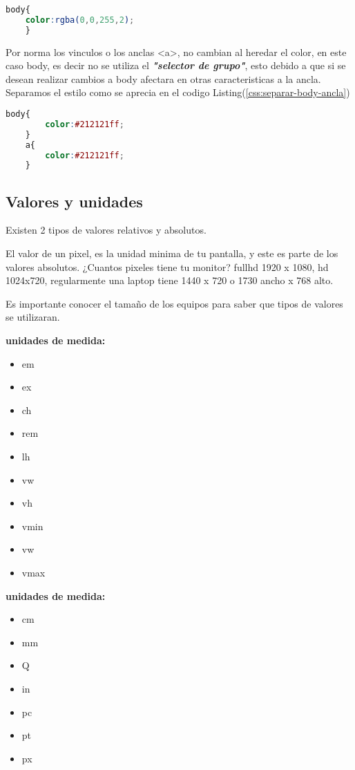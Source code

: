 \begin{lstlisting}[caption={Colores en css con hexadecimal},label={css:colores-rgba},language=css]
    body{
    color:rgba(0,0,255,2);
    }
\end{lstlisting}

Por norma los vinculos o los anclas <a>, no cambian al heredar el color, en este
caso body, es decir no se utiliza el \textbf{\textit{"selector de grupo"}}, esto debido
a que si se desean realizar cambios a body afectara en otras caracteristicas a la ancla.
Separamos el estilo como se aprecia en el codigo Listing(\ref{css:separar-body-ancla})

\begin{lstlisting}[caption={Colores en css con hexadecimal},label={css:colores-rgba},language=css]
    body{
        color:#212121ff;
    }
    a{
        color:#212121ff;
    }
\end{lstlisting}


\subsection{Valores y unidades}


Existen 2 tipos de valores relativos y absolutos.

El valor de un pixel, es la unidad minima de tu pantalla, y este es parte de los valores absolutos.
\newline
¿Cuantos pixeles tiene tu monitor? fullhd 1920 x 1080, hd 1024x720,
regularmente una laptop tiene 1440 x 720 o 1730 ancho x 768 alto.

Es importante conocer el tamaño de los equipos para saber que tipos de valores se utilizaran.


\textbf{ unidades de medida: }

\begin{itemize}
    \item em
    \item ex
    \item ch
    \item rem
    \item lh
    \item vw
    \item vh
    \item vmin
    \item vw
    \item vmax
\end{itemize}

\textbf{ unidades de medida: }

\begin{itemize}
    \item cm
    \item mm
    \item Q
    \item in
    \item pc
    \item pt
    \item px
\end{itemize}

